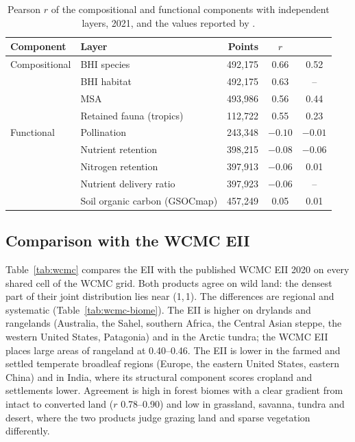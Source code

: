 \documentclass[11pt,a4paper]{article}
\begin{document}
\begin{table}[H]
\centering\small
\caption{Pearson $r$ of the compositional and functional components with independent layers,
2021, and the values reported by \citet{hill2026}.}
\label{tab:component-layers}
\begin{tabular}{llrcc}
\toprule
Component & Layer & Points & $r$ & \citet{hill2026} \\
\midrule
Compositional & BHI species & 492,175 & 0.66 & 0.52 \\
 & BHI habitat & 492,175 & 0.63 & -- \\
 & MSA & 493,986 & 0.56 & 0.44 \\
 & Retained fauna (tropics) & 112,722 & 0.55 & 0.23 \\
Functional & Pollination & 243,348 & $-0.10$ & $-0.01$ \\
 & Nutrient retention & 398,215 & $-0.08$ & $-0.06$ \\
 & Nitrogen retention & 397,913 & $-0.06$ & 0.01 \\
 & Nutrient delivery ratio & 397,923 & $-0.06$ & -- \\
 & Soil organic carbon (GSOCmap) & 457,249 & 0.05 & 0.01 \\
\bottomrule
\end{tabular}
\end{table}

\subsection{Comparison with the WCMC EII}
\label{sec:wcmc}

Table~\ref{tab:wcmc} compares the EII with the published WCMC EII 2020 on every shared cell of
the WCMC grid. Both products agree on wild land: the densest part of their joint distribution lies near
(1,\,1). The
differences are regional and systematic (Table~\ref{tab:wcmc-biome}). The EII is higher on
drylands and rangelands (Australia, the Sahel, southern Africa, the Central Asian steppe, the
western United States, Patagonia) and in the Arctic tundra; the WCMC EII places large areas of
rangeland at 0.40--0.46. The EII is lower in the farmed and settled temperate broadleaf
regions (Europe, the eastern United States, eastern China) and in India, where its structural
component scores cropland and settlements lower. Agreement is high in forest biomes with a
clear gradient from intact to converted land ($r$ 0.78--0.90) and low in grassland, savanna,
tundra and desert, where the two products judge grazing land and sparse vegetation differently.
\end{document}

